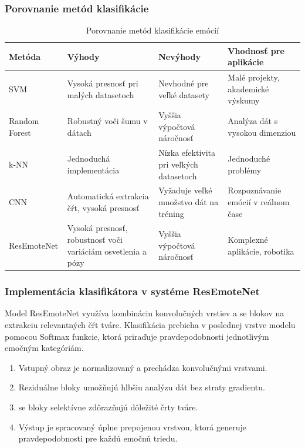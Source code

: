 \subsubsection{Porovnanie metód klasifikácie}
\begin{table}[H]
\centering
\begin{tabularx}{\textwidth}{|l|X|X|X|}
    \hline
    \textbf{Metóda} & \textbf{Výhody} & \textbf{Nevýhody} & \textbf{Vhodnosť pre aplikácie} \\ \hline
    SVM & Vysoká presnosť pri malých datasetoch & Nevhodné pre veľké datasety & Malé projekty, akademické výskumy \\ \hline
    Random Forest & Robustný voči šumu v dátach & Vyššia výpočtová náročnosť & Analýza dát s vysokou dimenziou \\ \hline
    k-NN & Jednoduchá implementácia & Nízka efektivita pri veľkých datasetoch & Jednoduché problémy \\ \hline
    CNN & Automatická extrakcia čŕt, vysoká presnosť & Vyžaduje veľké množstvo dát na tréning & Rozpoznávanie emócií v reálnom čase \\ \hline
    ResEmoteNet & Vysoká presnosť, robustnosť voči variáciám osvetlenia a pózy & Vyššia výpočtová náročnosť & Komplexné aplikácie, robotika \\ \hline
\end{tabularx}
\caption{Porovnanie metód klasifikácie emócií}
\end{table}

\subsubsection{Implementácia klasifikátora v systéme ResEmoteNet}
Model ResEmoteNet využíva kombináciu konvolučných vrstiev a \gls{se} blokov na extrakciu relevantných čŕt tváre. Klasifikácia prebieha v poslednej vrstve modelu pomocou Softmax funkcie, ktorá priraďuje pravdepodobnosti jednotlivým emočným kategóriám.

\begin{enumerate}
    \item Vstupný obraz je normalizovaný a prechádza konvolučnými vrstvami.
    \item Reziduálne bloky umožňujú hlbšiu analýzu dát bez straty gradientu.
    \item \gls{se} bloky selektívne zdôrazňujú dôležité črty tváre.
    \item Výstup je spracovaný úplne prepojenou vrstvou, ktorá generuje pravdepodobnosti pre každú emočnú triedu.
\end{enumerate}

